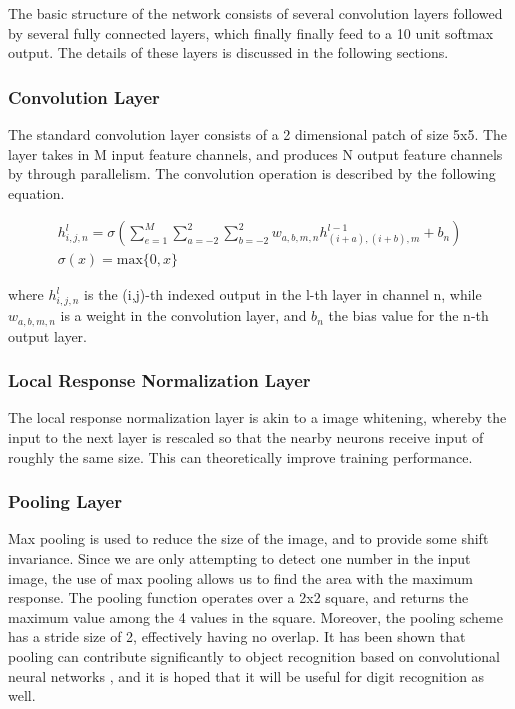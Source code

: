 \documentclass{article} %
\begin{document}
The basic structure of the network consists of several convolution layers followed by several fully connected layers, which finally finally feed to a 10 unit softmax output. The details of these layers is discussed in the following sections. 

\subsubsection{Convolution Layer}

The standard convolution layer consists of a 2 dimensional patch of size 5x5. The layer takes in M input feature channels, and produces N output feature channels by through parallelism. The convolution operation is described by the following equation. 

\begin{gather}
h^l_{i,j,n} = \sigma(\sum_{e=1}^{M}{\sum_{a=-2}^{2}{\sum_{b=-2}^{2} w_{a,b,m,n}h_{(i+a),(i+b),m}^{l-1}} + b_n}) \\
\sigma(x) = \text{max}\{0, x\}
\end{gather}

where $h^l_{i,j,n}$ is the (i,j)-th indexed output in the l-th layer in channel n, while $w_{a,b,m,n}$ is a weight in the convolution layer, and $b_n$ the bias value for the n-th output layer. 

\subsubsection{Local Response Normalization Layer}

The local response normalization layer is akin to a image whitening, whereby the input to the next layer is rescaled so that the nearby neurons receive input of roughly the same size. This can theoretically improve training performance. 

\subsubsection{Pooling Layer} 

Max pooling is used to reduce the size of the image, and to provide some shift invariance. Since we are only attempting to detect one number in the input image, the use of max pooling allows us to find the area with the maximum response. The pooling function operates over a 2x2 square, and returns the maximum value among the 4 values in the square. Moreover, the pooling scheme has a stride size of 2, effectively having no overlap. It has been shown that pooling can contribute significantly to object recognition based on convolutional neural networks \cite{pooling}, and it is hoped that it will be useful for digit recognition as well. 
\end{document}
